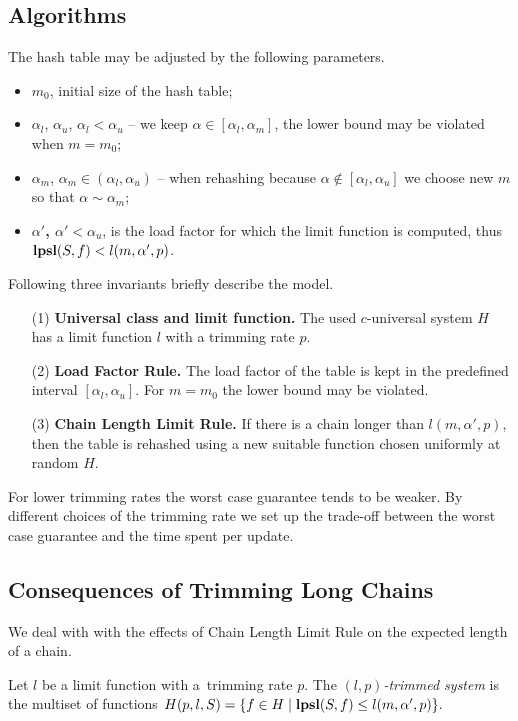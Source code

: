 \subsection{Algorithms}
The hash table may be adjusted by the following parameters.
\begin{itemize}
	\item {$m_0$}, initial size of the hash table;
	\item {$\alpha_l$, $\alpha_u$, $\alpha_l < \alpha_u$} -- we keep $\alpha \in [\alpha_l, \alpha_m]$, the lower bound may be violated when $m = m_0$;
	\item {$\alpha_m$, $\alpha_m \in (\alpha_l, \alpha_u)$} -- when rehashing because $\alpha \notin [\alpha_l, \alpha_u]$ we choose new $m$ so that $\alpha \sim \alpha_m$;
	\item \textbf{$\alpha'$, $\alpha' < \alpha_u$}, is the load factor for which the limit function is computed, thus $\mathbf{lpsl}(S, f) < l(m, \alpha', p)$.
\end{itemize}
Following three invariants briefly describe the model. 
\begin{itemize}
\item[(1)] \textbf{Universal class and limit function.} The used $c$-universal system $H$ has a limit function $l$ with a trimming rate $p$.
\item[(2)] \textbf{Load Factor Rule.} The load factor of the table is kept in the predefined interval $[\alpha_l, \alpha_u]$. For $m = m_0$ the lower bound may be violated.
\item[(3)] \textbf{Chain Length Limit Rule.} If there is a chain longer than $l(m, \alpha', p)$, then the table is rehashed using a new suitable function chosen uniformly at random $H$.
\end{itemize}

For lower trimming rates the worst case guarantee tends to be weaker.
By different choices of the trimming rate we set up the trade-off between the worst case guarantee and the time spent per update.



\subsection{Consequences of Trimming Long Chains}
We deal with with the effects of Chain Length Limit Rule on the expected length of a chain.

\begin{definition}
\label{definition-trimmed-system}
Let $l$ be a limit function with a~trimming rate $p$.
The \emph{$(l, p)$-trimmed system} is the multiset of functions $H(p, l, S) = \{ f \in H \mid \mathbf{lpsl}(S, f) \leq l(m, \alpha', p) \}.$
\end{definition}

